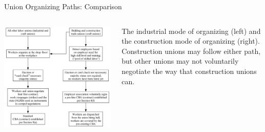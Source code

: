 \documentclass{beamer}
\begin{document}
\begin{frame}{Union Organizing Paths: Comparison}
  \begin{columns}
    \includegraphics[scale=0.15]{../images/organizing_paths}

    The industrial mode of organizing (left) and the construction mode of organizing (right).\newline\newline
    Construction unions may follow either path, but other unions may not voluntarily negotiate the way that construction unions can.
    \end{columns}
\end{frame}

%
\end{document}
